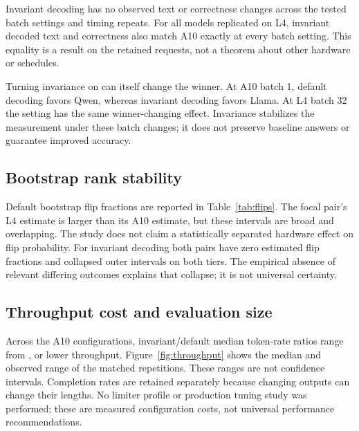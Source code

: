 \documentclass[10pt,twocolumn]{article}
\begin{document}
Invariant decoding has no observed text or correctness changes across the tested batch settings and timing repeats. For all \NLfourModels{} models replicated on L4, invariant decoded text and correctness also match A10 exactly at every batch setting. This equality is a result on the retained requests, not a theorem about other hardware or schedules.

Turning invariance on can itself change the winner. At A10 batch 1, default decoding favors Qwen, whereas invariant decoding favors Llama. At L4 batch 32 the setting has the same winner-changing effect. Invariance stabilizes the measurement under these batch changes; it does not preserve baseline answers or guarantee improved accuracy.

\begin{table}[t]
\centering\small

\caption{Items with changed decoded text or correctness across batches, out of \NItems{} per row. D and I denote default and invariant arms. Default text-change intervals are \textbf{exploratory, unadjusted Wilson 95\% intervals}, in percent. Every invariant text count is zero; its exploratory interval is $[0,\ZeroUpper]$. Rows repeat the same questions and cannot be pooled as independent observations.}
\label{tab:changes}
\end{table}

\subsection{Bootstrap rank stability}
Default bootstrap flip fractions are reported in Table~\ref{tab:flips}. The focal pair's L4 estimate is larger than its A10 estimate, but these intervals are broad and overlapping. The study does not claim a statistically separated hardware effect on flip probability. For invariant decoding both pairs have zero estimated flip fractions and collapsed outer intervals on both tiers. The empirical absence of relevant differing outcomes explains that collapse; it is not universal certainty.

\begin{table}[t]
\centering\scriptsize

\caption{Default paired-item bootstrap batch-flip fractions and \textbf{exploratory, unadjusted 95\% outer intervals}. Invariant fractions and outer intervals are zero for both pairs on both tiers, with the boundary limitation described in the text.}
\label{tab:flips}
\end{table}

\subsection{Throughput cost and evaluation size}
Across the A10 configurations, invariant/default median token-rate ratios range from \TokenRatioRange{}, or \ThroughputLoss{} lower throughput. Figure~\ref{fig:throughput} shows the median and observed range of the matched repetitions. These ranges are not confidence intervals. Completion rates are retained separately because changing outputs can change their lengths. No limiter profile or production tuning study was performed; these are measured configuration costs, not universal performance recommendations.
\end{document}
